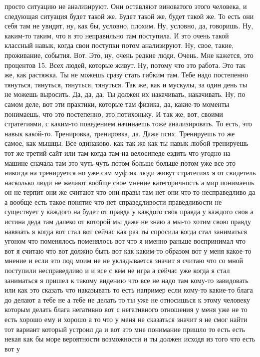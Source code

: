 просто ситуацию не анализируют. Они оставляют
виноватого этого человека,
и следующая ситуация будет такой же.
Будет такой же, будет такой же.
То есть они себя там не увидят,
ну, как бы, условно, плохим.
Ну, условно, да, говоришь. Ну, каким-то таким, что
я это неправильно там поступила.
И это
очень такой классный навык, когда
свои поступки потом анализируют.
Ну, свое, такие, проживание,
события. Вот. Это,
ну, очень редкие люди. Очень.
Мне кажется, это
процентов 15. Всех людей,
которые живут. Ну, потому что это работа.
Это так же, как растяжка. Ты не можешь
сразу стать гибким там.
Тебе надо постепенно тянуться, тянуться,
тянуться, тянуться. Так же, как
и мускулы, за один день ты не можешь выросить.
Да, да, да. Ты должен их накачивать, накачивать.
Ну, по самом деле, вот эти практики, которые там
физика, да, какие-то
моменты понимаешь, что это постепенно,
это потихоньку. И так же, вот,
своими
стратегиями, с каким-то поведением
начинаешь тоже анализировать.
То есть, это навык какой-то. Тренировка, тренировка,
да. Даже псих. Тренируешь
то же самое, как мышцы. Все одинаково.
как так же как ты навык любой тренируешь тот же третий сайт или там когда там на
велосипеде ездить что угодно на машине сначала там это чуть-чуть потом больше
больше потом уже все это никогда на тренируется но уже сам муфтик
люди живут стратегиях я от свидетель насколько люди не желают вообще свое
мнение категоричность а мир понимаешь он не терпит они же считают что они правы
там нет они что-то несправедливо да а вообще есть такое понятие что нет
справедливости праведливости не существует у каждого на будет от правда
у каждого своя правда у каждого своя а истина деда там далеко от которой мы даже
не знаю а мы-то хотим свою правду навязать я когда вот стал вот сейчас как
раз ты спросила когда
стал заниматься угоном что поменялось поменялось вот что я именно раньше
воспринимал что вот я считаю что вот должно быть вот как каким-то образом вот
у меня какое-то мнение и если это под моим не не укладывается значит я считаю
что со мной поступили несправедливо и и все с кем не игра а сейчас уже когда я
стал заниматься я
пришел к такому видению что все не надо там кому-то завидовать или как это сказать
что наказывать то есть например если кому-то какие-то блага до делают а тебе
не а тебе не делать то ты уже не относишься к этому человеку которым
делать блага негативно вот с негативного отношения у меня уже не
то есть хорошо ему и хорошо а то что у меня не сказаться значит я не смог найти
тот вариант который устроил да и вот это мне понимание пришло то есть есть некая
как бы море вероятности возможности и ты должен исходя из того что есть вот у
